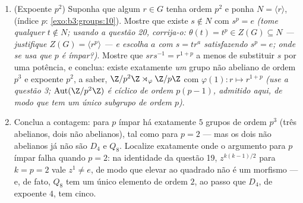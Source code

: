 \begin{problem}
\begin{enumerate}[resume]
        $p$ é isomorfo a $H_p$.
  \item (Expoente $p^2$) Suponha que algum $r \in G$ tenha ordem
        $p^2$ e ponha $N = \langle r\rangle$,  (índice $p$:
        \cref{exo:b3:groups:10}). Mostre que existe $s \notin N$ com $s^p = e$
        \emph{(tome qualquer $t \notin N$; usando a questão 20, corrija-o:
        $\theta(t) = t^p \in Z(G) \subseteq N$ --- justifique $Z(G) = \langle r^p\rangle$ --- e escolha $a$ com $s = tr^{a}$
        satisfazendo $s^p = e$; onde se usa que $p$ é ímpar?)}.
        Mostre que $srs^{-1} = r^{1+p}$ a menos de substituir $s$ por uma
        potência, e conclua: existe exatamente \emph{um} grupo não
        abeliano de ordem $p^3$ e expoente $p^2$, a saber,
        $\Z/p^2\Z \rtimes_\varphi \Z/p\Z$ com $\varphi(1)\colon r \mapsto r^{1+p}$ \emph{(use a questão 3; $\operatorname{Aut}(\Z/p^2\Z)$ é cíclico de
        ordem $p(p-1)$, admitido aqui, de modo que tem um único
        subgrupo de ordem $p$)}.
  \item Conclua a contagem: para $p$ ímpar há exatamente $5$
        grupos de ordem $p^3$ (três abelianos, dois não
        abelianos), tal como para $p = 2$ --- mas os dois não
        abelianos já não são $D_4$ e $Q_8$. Localize
        exatamente onde o argumento para $p$ ímpar falha quando
        $p = 2$: na identidade da questão 19, $z^{k(k-1)/2}$ para $k = p = 2$
        vale $z^1 \neq
        e$, de modo que elevar ao quadrado não é um morfismo
        --- e, de fato, $Q_8$ tem um único elemento de ordem
        $2$, ao passo que $D_4$, de expoente $4$, tem
        cinco.
\end{enumerate}


\end{problem}
